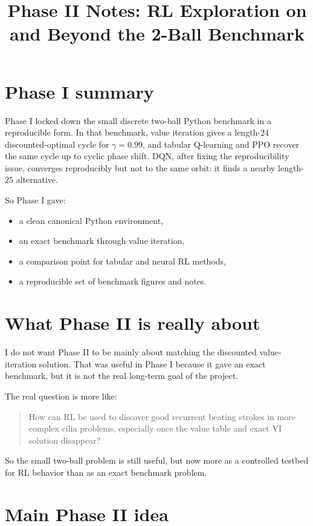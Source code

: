 \documentclass{article}
\title{Phase II Notes: RL Exploration on and Beyond the 2-Ball Benchmark}
\begin{document}
\maketitle

\section{Phase I summary}

Phase I locked down the small discrete two-ball Python benchmark in a reproducible form. In that benchmark, value iteration gives a length-$24$ discounted-optimal cycle for $\gamma=0.99$, and tabular Q-learning and PPO recover the same cycle up to cyclic phase shift. DQN, after fixing the reproducibility issue, converges reproducibly but not to the same orbit: it finds a nearby length-$25$ alternative.

So Phase I gave:
\begin{itemize}
    \item a clean canonical Python environment,
    \item an exact benchmark through value iteration,
    \item a comparison point for tabular and neural RL methods,
    \item a reproducible set of benchmark figures and notes.
\end{itemize}

\section{What Phase II is really about}

I do not want Phase II to be mainly about matching the discounted value-iteration solution. That was useful in Phase I because it gave an exact benchmark, but it is not the real long-term goal of the project.

The real question is more like:
\begin{quote}
How can RL be used to discover good recurrent beating strokes in more complex cilia problems, especially once the value table and exact VI solution disappear?
\end{quote}

So the small two-ball problem is still useful, but now more as a controlled testbed for RL behavior than as an exact benchmark problem.

\section{Main Phase II idea}
\end{document}
